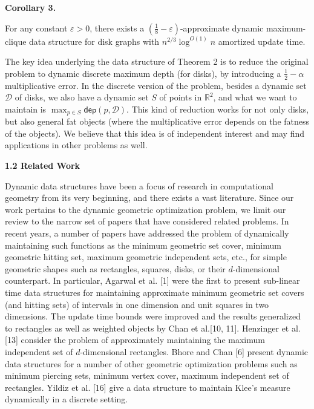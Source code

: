 \par
\par
\par\medskip\noindent\textbf{Corollary 3.}\par
For any constant $\varepsilon>0$, there exists a $(\frac{1}{8}-\varepsilon)$-approximate dynamic maximum-clique data structure for disk graphs with $n^{2/3}\log^{O(1)}n$ amortized update time.
\par
\par
\par
The key idea underlying the data structure of Theorem 2 is to reduce the original problem to dynamic discrete maximum depth (for disks), by introducing a $\frac{1}{2}-\alpha$ multiplicative error. In the discrete version of the problem, besides a dynamic set $\mathcal{D}$ of disks, we also have a dynamic set $S$ of points in $\mathbb{R}^{2}$, and what we want to maintain is $\max_{p\in S}\mathsf{dep}(p,\mathcal{D})$. This kind of reduction works for not only disks, but also general fat objects (where the multiplicative error depends on the fatness of the objects). We believe that this idea is of independent interest and may find applications in other problems as well.
\par
\par
\par\medskip\noindent\textbf{1.2 Related Work}\par
Dynamic data structures have been a focus of research in computational geometry from its very beginning, and there exists a vast literature. Since our work pertains to the dynamic geometric optimization problem, we limit our review to the narrow set of papers that have considered related problems. In recent years, a number of papers have addressed the problem of dynamically maintaining such functions as the minimum geometric set cover, minimum geometric hitting set, maximum geometric independent sets, etc., for simple geometric shapes such as rectangles, squares, disks, or their $d$-dimensional counterpart. In particular, Agarwal et al. [1] were the first to present sub-linear time data structures for maintaining approximate minimum geometric set covers (and hitting sets) of intervals in one dimension and unit squares in two dimensions. The update time bounds were improved and the results generalized to rectangles as well as weighted objects by Chan et al.[10, 11]. Henzinger et al. [13] consider the problem of approximately maintaining the maximum independent set of $d$-dimensional rectangles. Bhore and Chan [6] present dynamic data structures for a number of other geometric optimization problems such as minimum piercing sets, minimum vertex cover, maximum independent set of rectangles. Yildiz et al. [16] give a data structure to maintain Klee’s measure dynamically in a discrete setting.
